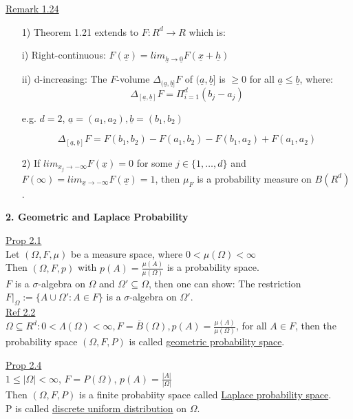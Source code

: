 \documentclass[10pt,letterpaper]{article}
\begin{document}
\underline{Remark 1.24}\\

\begin{enumerate}
\item[1)] Theorem 1.21 extends to $F:R^d\rightarrow R$ which is:
  \item[i)] Right-continuous: $F(\underline{x}) = {lim}_{\underline{h}\rightarrow\underline{0}}
  F(\underline{x}+\underline{h})$
  \item[ii)] d-increasing: The $F$-volume $\Delta_{(\underline{a},\underline{b}]}F$ of 
  $(\underline{a},\underline{b}]$ is $\geq 0$ for all $\underline{a}\leq\underline{b}$, where:\\
  $$\Delta_{[\underline{a},\underline{b}]}F = \Pi_{i=1}^d(b_j-a_j)$$
  \begin{center}e.g. $d=2$, $\underline{a}=(a_1, a_2), \underline{b}=(b_1, b_2)$\end{center}
  $$\Delta_{[\underline{a},\underline{b}]}F = F(b_1, b_2) - F(a_1, b_2) - F(b_1, a_2) + F(a_1, a_2)$$
\item[2)] If ${lim}_{x_j\rightarrow -\infty} F(\underline{x})=0$ for some $j\in\{1,\dots,d\}$ and
$F(\infty)={lim}_{\underline{x}\rightarrow -\infty} F(\underline{x})=1$, then $\mu_F$ is
a probability measure on $B(R^d)$.

\end{enumerate}
\pagebreak

\begin{center}
\textbf{2. Geometric and Laplace Probability}
\end{center}

\underline{Prop 2.1}\\

Let $(\Omega, F, \mu)$ be a measure space, where $0<\mu(\Omega)<\infty$\\

Then $(\Omega, F, p)$ with $p(A)=\frac{\mu(A)}{\mu(\Omega)}$ is a probability space.\\

$F$ is a $\sigma$-algebra on $\Omega$ and $\Omega' \subseteq \Omega$, then one can show: The
restriction $F|_{\Omega}:=\{A\cup \Omega': A\in F\}$ is a $\sigma$-algebra on $\Omega'$.\\

\underline{Ref 2.2}\\

$\Omega\subseteq R^d: 0<\Lambda(\Omega)<\infty, F=\overline{B}(\Omega), 
p(A)=\frac{\mu(A)}{\mu(\Omega)}$, for all $A\in F$, then the probability space $(\Omega, F, P)$ is 
called \underline{geometric probability space}.

\underline{Prop 2.4}\\

$1\leq |\Omega| <\infty$, $F=P(\Omega)$, $p(A) = \frac{|A|}{|\Omega|}$\\

Then $(\Omega, F, P)$ is a finite probabiity space called \underline{Laplace probability space}.\\

P is called \underline{discrete uniform distribution} on $\Omega$.
\end{document}
